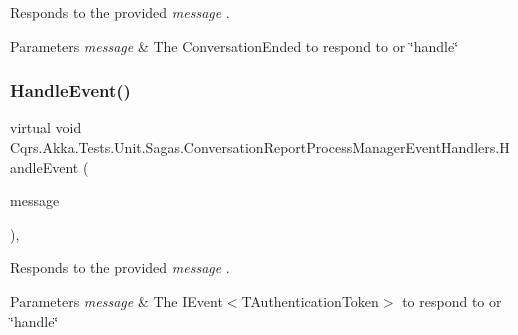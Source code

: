Responds to the provided {\itshape message} . 


\begin{DoxyParams}{Parameters}
{\em message} & The Conversation\+Ended to respond to or \char`\"{}handle\char`\"{}\\
\hline
\end{DoxyParams}
\mbox{\label{classCqrs_1_1Akka_1_1Tests_1_1Unit_1_1Sagas_1_1ConversationReportProcessManagerEventHandlers_a51207786638b00eaae1cae24d0053822_a51207786638b00eaae1cae24d0053822}} 
\subsubsection{\texorpdfstring{Handle\+Event()}{HandleEvent()}}
{\footnotesize\ttfamily virtual void Cqrs.\+Akka.\+Tests.\+Unit.\+Sagas.\+Conversation\+Report\+Process\+Manager\+Event\+Handlers.\+Handle\+Event (\begin{DoxyParamCaption}\item[{\hyperlink{interfaceCqrs_1_1Events_1_1IEvent}{I\+Event}$<$ Guid $>$}]{message }\end{DoxyParamCaption})\hspace{0.3cm}{\ttfamily [protected]}, {\ttfamily [virtual]}}



Responds to the provided {\itshape message} . 


\begin{DoxyParams}{Parameters}
{\em message} & The I\+Event$<$\+T\+Authentication\+Token$>$ to respond to or \char`\"{}handle\char`\"{}\\
\hline
\end{DoxyParams}


